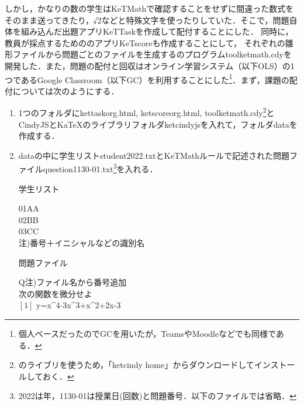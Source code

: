 \documentclass[a4j,12pt]{ujarticle}
\begin{document}
しかし，かなりの数の学生はKeTMathで確認することをせずに間違った数式をそのまま送ってきたり，√2などと特殊文字を使ったりしていた．そこで，問題自体を組み込んだ出題アプリKeTTaskを作成して配付することにした．%
同時に，教員が採点するためののアプリKeTscoreも作成することにして，%
それぞれの雛形ファイルから問題ごとのファイルを生成する\ketcindy のプログラムtoolketmath.cdyを開発した．また，問題の配付と回収はオンライン学習システム（以下OLS）の1つであるGoogle Classroom（以下GC）を利用することにした\footnote{個人ベースだったのでGCを用いたが，TeamsやMoodleなどでも同様である．}．まず，課題の配付については次のようにする．\vspace{-1mm}
\begin{enumerate}
\item 1つのフォルダにkettaskorg.html, ketscoreorg.html, toolketmath.cdy\footnote{\ketcindy のライブリを使うため，「ketcindy home」からダウンロードしてインストールしておく．}とCindyJSとKaTeXのライブラリフォルダketcindyjsを入れて，フォルダdataを作成する．\vspace{-2mm}
\item dataの中に学生リストstudent2022.txtとKeTMathルールで記述された問題ファイルquestion1130-01.txt\footnote{2022は年，1130-01は授業日(回数)と問題番号．以下のファイルでは省略．}を入れる．\vspace{3mm}\\
\begin{minipage}[t]{68mm}
\begin{center}
学生リスト
\end{center}
\hspace*{2zw}01AA\\
\hspace*{2zw}02BB\\
\hspace*{2zw}03CC\\
\hfill{\small 注)番号＋イニシャルなどの識別名}
\end{minipage}\hspace{6mm}%
\begin{minipage}[t]{68mm}
\begin{center}
問題ファイル
\end{center}
\hspace*{2zw}Q\hfill{\small 注)ファイル名から番号追加}\\
\hspace*{2zw}次の関数を微分せよ\\
\hspace*{2zw}$[1]$ y=x\^{}4-3x\^{}3+x\^{}2+2x-3\\

\end{minipage}
\end{enumerate}
\end{document}

